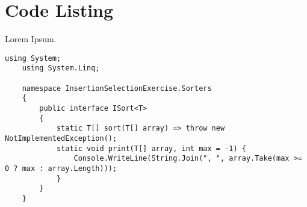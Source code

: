 \section{Code Listing}

Lorem Ipsum.

\begin{lstlisting}[language={[Sharp]C}, caption={ISort Interface}, label={script:isort}]
    using System;
    using System.Linq;
    
    namespace InsertionSelectionExercise.Sorters
    {
        public interface ISort<T>
        {
            static T[] sort(T[] array) => throw new NotImplementedException();
            static void print(T[] array, int max = -1) {
                Console.WriteLine(String.Join(", ", array.Take(max >= 0 ? max : array.Length)));
            }
        }
    }
\end{lstlisting}